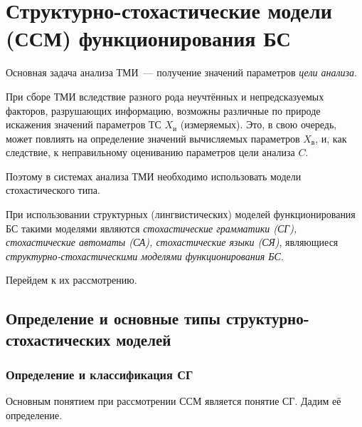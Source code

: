 \section{Структурно-стохастические модели (ССМ) функционирования БС}

Основная задача анализа ТМИ~--- получение значений параметров
\emph{цели анализа}.

При сборе ТМИ вследствие разного рода неучтённых и непредсказуемых
факторов, разрушающих информацию, возможны различные по природе
искажения значений параметров ТС $X_и$ (измеряемых). Это, в свою
очередь, может повлиять на определение значений вычисляемых параметров
$X_в$, и, как следствие, к неправильному оцениванию параметров цели
анализа $C$.

Поэтому в системах анализа ТМИ необходимо использовать модели
стохастического типа.

При использовании структурных (лингвистических) моделей
функционирования БС такими моделями являются \emph{стохастические
  грамматики (СГ), стохастические автоматы (СА), стохастические языки
  (СЯ)}, являющиеся \emph{структурно-стохастическими моделями
  функционирования БС}.

Перейдем к их рассмотрению.


\subsection{Определение и основные типы структурно-стохастических моделей}

\subsubsection{Определение и классификация СГ}

Основным понятием при рассмотрении ССМ является понятие СГ. Дадим её
определение.

